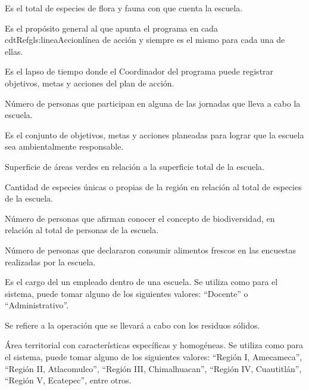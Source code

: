 \begin{description}
     Es el total de especies de flora y fauna con que cuenta la escuela.
    
     Es el propósito general al que apunta el programa en cada cdtRef{gls:lineaAccion}{línea de acción} y siempre es el mismo para cada una de ellas.
    
     Es el lapso de tiempo donde el Coordinador del programa puede registrar objetivos, metas y acciones del plan de acción.
    
     Número de personas que participan en alguna de las jornadas que lleva a cabo la escuela.

     Es el conjunto de objetivos, metas y acciones planeadas para lograr que la escuela sea ambientalmente responsable.
    
     Superficie de áreas verdes en relación a la superficie total de la escuela.
    
     Cantidad de especies únicas o propias de la región en relación al total de especies de la escuela.
    
     Número de personas que afirman conocer el concepto de biodiversidad, en relación al total de personas de la escuela.
    
     Número de personas que declararon consumir alimentos frescos en las encuestas realizadas por la escuela.
    
     Es el cargo del un empleado dentro de una escuela. Se utiliza como  para el sistema, puede tomar alguno de los siguientes valores: ``Docente'' o ``Administrativo''.
    
     Se refiere a la operación que se llevará a cabo con los residuos sólidos.

     Área territorial con características específicas y homogéneas. Se utiliza como  para el sistema, puede tomar alguno de los siguientes valores: ``Región I, Amecameca'', ``Región II, Atlacomulco'', ``Región III, Chimalhuacan'', ``Región IV, Cuautitlán'', ``Región V, Ecatepec'', entre otros.


\end{description}
